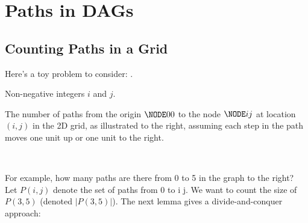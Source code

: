 

\section{Paths in DAGs}\label{dp: sec: paths in DAGs}


\subsection{Counting Paths in a Grid}

Here's a toy problem to consider: .

\noindent\parbox{4in}{
  \begin{mylist}
  \item[\bf input:]
    Non-negative integers $i$ and $j$.

  \item[\bf output:]
    The number of paths from the origin $\NODE 0 0$ to the node $\NODE i j$ at location $(i, j)$
    in the 2D grid,  as illustrated to the right,
    assuming each step in the path moves one unit up or one unit to the right.
  \end{mylist}
}~~\parbox{2in}{
}

For example, how many paths are there from  0
to   5 in the graph to the right?
Let $P(i,j)$ denote the set of paths from  0 to \NODE i j.
We want to count the size of $P(3,5)$ (denoted $|P(3,5)|$).
The next lemma gives a divide-and-conquer approach:

